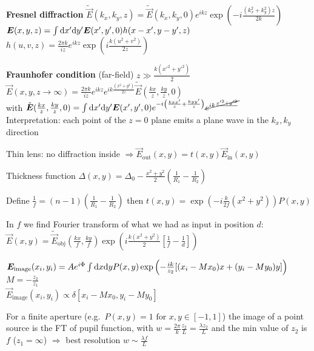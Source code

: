 \begin{squishlist}
    \item \textbf{Fresnel diffraction} $\tilde{\vec{E}}(k_x,k_y,z) = \tilde{\vec{E}}(k_x,k_y,0)e^{ikz} \exp\left({-i\frac{(k_x^2 + k_y^2)z}{2k}}\right)$\\
    $\bm{E}(x,y,z) = \int \textrm{d} x' \textrm{d} y' \bm{E}(x',y',0) h(x-x', y-y', z)$ \\
    $h (u,v,z)= \frac{2\pi k}{iz} e^{ikz} \exp \left(i \frac{k(u^2 + v^2)}{2z}\right)$
    \item \textbf{Fraunhofer condition} (far-field) $z \gg \frac{k(x'^2 + y'^2)}{2}$ \\
    $\vec{E}(x,y,z\rightarrow \infty) = \frac{2\pi k}{iz} e^{ikz}e^{ik\frac{(x^2+y^2)}{2z}} \tilde{\vec{E}}(\frac{kx}{z}, \frac{ky}{z},0)$ \\ 
    with $\tilde{\bm{E}}(\frac{kx}{z}, \frac{ky}{z},0) = \int \textrm{d} x' \textrm{d} y'\bm{E}(x', y', 0) e^{-i \left(\frac{kxx'}{z} + \frac{kyy'}{z}\right)} \cancel{e^{ik\frac{x'^2+y'^2}{}}}$\\
    Interpretation: each point of the $z=0$ plane emits a plane wave in the $k_x,k_y$ direction
\end{squishlist}
\begin{squishlist}
    \item Thin lens: no diffraction inside $ \Rightarrow \vec{E}_{\text{out}}(x,y) = t(x,y) \vec{E}_{\text{in}}(x,y)$
    \item Thickness function $\Delta(x,y) = \Delta_0 - \frac{x^2 + y^2}{2} \left( \frac{1}{R_1} - \frac{1}{R_2} \right)$
    \item Define $\frac{1}{f} = (n-1) \left( \frac{1}{R_1} - \frac{1}{R_2} \right)$ then $t(x,y) = \exp(-i \frac{k}{2f}(x^2 + y^2)) P(x,y)$
    \item In $f$ we find Fourier transform of what we had as input in position $d$: \\
    ${\vec{E}}(x,y) = \tilde{\vec{E}}_{\text{obj}}(\frac{kx}{f},\frac{ky}{f})\exp \left(i\frac{k(x^2 + y^2)}{2}\left[\frac{1}{f}-\frac{1}{d}\right]\right)$
    \item$\bm{E}_{\text{image}}(x_i,y_i) = Ae^{i\Phi} \int \textrm{d} x \textrm{d} y P(x,y) \exp \left(-\frac{ik}{z_2} [(x_i- M x_0)x + (y_i - M y_0)y]\right)$ \quad $M = -\frac{z_2}{z_1}$ \\
    $\vec{E}_{\text{image}}(x_i,y_i) \propto \delta [x_i - M x_0, y_i - M y_0]$
    \item For a finite aperture (e.g.\ $P(x,y)=1 \text{ for } x,y \in [-1,1]$) the image of a point source is the FT of pupil function, with $w = \frac{2\pi}{k}\frac{z_2}{L} = \frac{\lambda z_2}{L}$ and the min value of $z_2$ is $f$ ($z_1 = \infty$) $\Longrightarrow$
    best resolution $w \sim \frac{\lambda f}{L}$ 
\end{squishlist}

